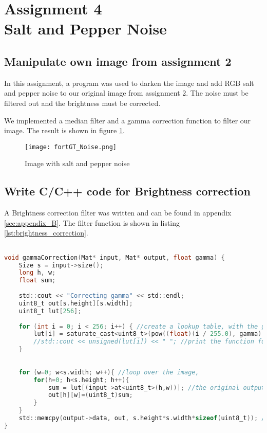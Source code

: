 \section {Assignment 4 \\ {Salt and Pepper Noise}}
\label {sec:assignment_4}

\subsection{Manipulate own image from assignment 2}

In this assignment, a program was used to darken the image and add RGB salt and pepper noise to our original image from assignment 2. The noise must be filtered out and the brightness must be corrected.

We implemented a median filter and a gamma correction function to filter our image. The result is shown in figure \ref{fig:fortGT_Noise}.

\begin{figure}[h!]
    \centering
    \texttt{[image: fortGT\_Noise.png]}
    \caption{Image with salt and pepper noise}
    \label{fig:fortGT_Noise}
\end{figure}

\subsection{Write C/C++ code for Brightness correction}

A Brightness correction filter was written and can be found in appendix \ref{sec:appendix_B}. The filter function is shown in listing \ref{lst:brightness_correction}.

\begin{lstlisting}[language=C, caption={Brightness correction}, label=lst:brightness_correction]

void gammaCorrection(Mat* input, Mat* output, float gamma) {
    Size s = input->size();
    long h, w;
    float sum;
    
    std::cout << "Correcting gamma" << std::endl;
    uint8_t out[s.height][s.width];
    uint8_t lut[256];	
    
    for (int i = 0; i < 256; i++) { //create a lookup table, with the gamma correction curve.
        lut[i] = saturate_cast<uint8_t>(pow((float)(i / 255.0), gamma) * 255.0f); //saturate cast negative values to 0, and higher values to 255 (uint8_t or unsigned char)
        //std::cout << unsigned(lut[i]) << " "; //print the function for testing. cout prints uint8_t as chars so we cast it.
    }
    
    
    for (w=0; w<s.width; w++){ //loop over the image, 
        for(h=0; h<s.height; h++){
            sum = lut[(input->at<uint8_t>(h,w))]; //the original output value will be scaled to the value in the LUT.
            out[h][w]=(uint8_t)sum;
        }
    }
    std::memcpy(output->data, out, s.height*s.width*sizeof(uint8_t)); //copy our standard 2D array to a new buffer that OpenCV understands
}
\end{lstlisting}

